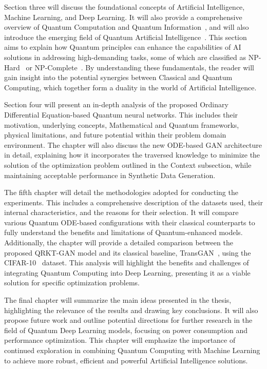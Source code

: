 \documentclass[12pt,a4paper]{report}
\begin{document}
Section three will discuss the foundational concepts of Artificial Intelligence, Machine Learning, and Deep Learning. It will also provide a comprehensive overview of Quantum Computation and Quantum Information~\cite{nielsen2001quantum}, and will also introduce the emerging field of Quantum Artificial Intelligence~\cite{dunjko2018machine}. This section aims to explain how Quantum principles can enhance the capabilities of AI solutions in addressing high-demanding tasks, some of which are classified as NP-Hard~\cite{chatterjee2024solving} or NP-Complete~\cite{furer2008solving}. By understanding these fundamentals, the reader will gain insight into the potential synergies between Classical and Quantum Computing, which together form a duality in the world of Artificial Intelligence.

Section four will present an in-depth analysis of the proposed Ordinary Differential Equation-based Quantum neural networks. This includes their motivation, underlying concepts, Mathematical and Quantum frameworks, physical limitations, and future potential within their problem domain environment. The chapter will also discuss the new ODE-based GAN architecture in detail, explaining how it incorporates the traversed knowledge to minimize the solution of the optimization problem outlined in the Context subsection, while maintaining acceptable performance in Synthetic Data Generation.

The fifth chapter will detail the methodologies adopted for conducting the experiments. This includes a comprehensive description of the datasets used, their internal characteristics, and the reasons for their selection. It will compare various Quantum ODE-based configurations with their classical counterparts to fully understand the benefits and limitations of Quantum-enhanced models. Additionally, the chapter will provide a detailed comparison between the proposed QRKT-GAN model and its classical baseline, TransGAN~\cite{jiang2021transgan}, using the CIFAR-10~\cite{Krizhevsky09learningmultiple} dataset. This analysis will highlight the benefits and challenges of integrating Quantum Computing into Deep Learning, presenting it as a viable solution for specific optimization problems.

The final chapter will summarize the main ideas presented in the thesis, highlighting the relevance of the results and drawing key conclusions. It will also propose future work and outline potential directions for further research in the field of Quantum Deep Learning models, focusing on power consumption and performance optimization. This chapter will emphasize the importance of continued exploration in combining Quantum Computing with Machine Learning to achieve more robust, efficient and powerful Artificial Intelligence solutions.
\end{document}
